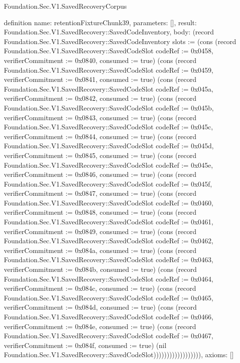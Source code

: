 \begin{lexlean}{Foundation.Sec.V1.SavedRecoveryCorpus}
\begin{semanticmodule}
definition{
  name: retentionFixtureChunk39,
  parameters: [],
  result: Foundation.Sec.V1.SavedRecovery::SavedCodeInventory,
  body: (record Foundation.Sec.V1.SavedRecovery::SavedCodeInventory {slots := (cons (record Foundation.Sec.V1.SavedRecovery::SavedCodeSlot {codeRef := 0x0458, verifierCommitment := 0x0840, consumed := true}) (cons (record Foundation.Sec.V1.SavedRecovery::SavedCodeSlot {codeRef := 0x0459, verifierCommitment := 0x0841, consumed := true}) (cons (record Foundation.Sec.V1.SavedRecovery::SavedCodeSlot {codeRef := 0x045a, verifierCommitment := 0x0842, consumed := true}) (cons (record Foundation.Sec.V1.SavedRecovery::SavedCodeSlot {codeRef := 0x045b, verifierCommitment := 0x0843, consumed := true}) (cons (record Foundation.Sec.V1.SavedRecovery::SavedCodeSlot {codeRef := 0x045c, verifierCommitment := 0x0844, consumed := true}) (cons (record Foundation.Sec.V1.SavedRecovery::SavedCodeSlot {codeRef := 0x045d, verifierCommitment := 0x0845, consumed := true}) (cons (record Foundation.Sec.V1.SavedRecovery::SavedCodeSlot {codeRef := 0x045e, verifierCommitment := 0x0846, consumed := true}) (cons (record Foundation.Sec.V1.SavedRecovery::SavedCodeSlot {codeRef := 0x045f, verifierCommitment := 0x0847, consumed := true}) (cons (record Foundation.Sec.V1.SavedRecovery::SavedCodeSlot {codeRef := 0x0460, verifierCommitment := 0x0848, consumed := true}) (cons (record Foundation.Sec.V1.SavedRecovery::SavedCodeSlot {codeRef := 0x0461, verifierCommitment := 0x0849, consumed := true}) (cons (record Foundation.Sec.V1.SavedRecovery::SavedCodeSlot {codeRef := 0x0462, verifierCommitment := 0x084a, consumed := true}) (cons (record Foundation.Sec.V1.SavedRecovery::SavedCodeSlot {codeRef := 0x0463, verifierCommitment := 0x084b, consumed := true}) (cons (record Foundation.Sec.V1.SavedRecovery::SavedCodeSlot {codeRef := 0x0464, verifierCommitment := 0x084c, consumed := true}) (cons (record Foundation.Sec.V1.SavedRecovery::SavedCodeSlot {codeRef := 0x0465, verifierCommitment := 0x084d, consumed := true}) (cons (record Foundation.Sec.V1.SavedRecovery::SavedCodeSlot {codeRef := 0x0466, verifierCommitment := 0x084e, consumed := true}) (cons (record Foundation.Sec.V1.SavedRecovery::SavedCodeSlot {codeRef := 0x0467, verifierCommitment := 0x084f, consumed := true}) (nil Foundation.Sec.V1.SavedRecovery::SavedCodeSlot)))))))))))))))))}),
  axioms: []
}


\end{semanticmodule}
\end{lexlean}
